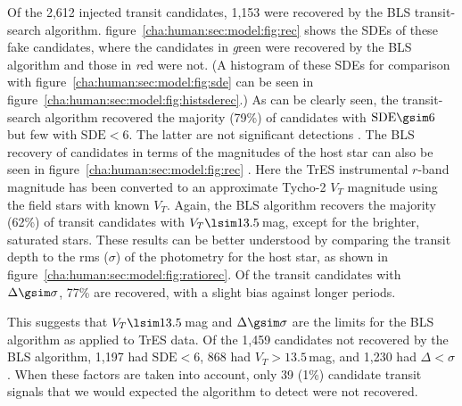 Of the 2,612 injected transit candidates, 1,153 were recovered by the BLS transit-search algorithm.
figure~\ref{cha:human:sec:model:fig:rec} %
shows the SDEs of these fake candidates, where the candidates in {\textit green} were recovered by the BLS algorithm and those in {\textit red} were not.
(A histogram of these SDEs for comparison with figure~\ref{cha:human:sec:model:fig:sde} can be seen in figure~\ref{cha:human:sec:model:fig:histsderec}.)
As can be clearly seen, the transit-search algorithm recovered the majority (79\%) of candidates with $\mathrm{SDE} \gsim 6$ but few with $\mathrm{SDE} < 6$. The latter are not significant detections \citep[see][]{Kovacs_Zucker_Mazeh:aa:2002a}.
The BLS recovery of candidates in terms of the magnitudes of the host star can also be seen in figure~\ref{cha:human:sec:model:fig:rec}%
.
Here the TrES instrumental $r$-band magnitude has been converted to an approximate Tycho-2 \citep{Hog_Fabricius_Makarov:aa:2000a} $V_{T}$ magnitude using the field stars with known $V_{T}$.
Again, the BLS algorithm recovers the majority (62\%) of transit candidates with $V_{T}\lsim 13.5$\,mag, except for the brighter, saturated stars.
These results can be better understood by comparing the transit depth to the rms ($\sigma$) of the photometry for the host star, as shown in figure~\ref{cha:human:sec:model:fig:ratiorec}. Of the transit candidates with $\Delta \gsim \sigma$,  77\% are recovered, with a slight bias against longer periods.

This suggests that $V_{T}\lsim 13.5$\,mag and $\Delta \gsim \sigma$ are the limits for the BLS algorithm as applied to TrES data.
Of the 1,459 candidates not recovered by the BLS algorithm, 1,197 had $\mathrm{SDE} < 6$, 868 had $V_{T}> 13.5$\,mag, and 1,230 had $\Delta < \sigma$. When these factors are taken into account, only 39 (1\%) candidate transit signals that we would expected the algorithm to detect were not recovered.

